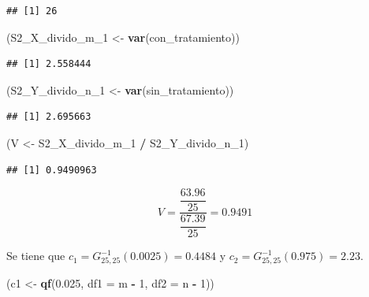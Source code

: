 \documentclass[
  12pt,
]{book}
\newenvironment{Shaded}{\begin{snugshade}}{\end{snugshade}}
\newcommand{\DataTypeTok}[1]{\textcolor[rgb]{0.13,0.29,0.53}{#1}}
\newcommand{\DecValTok}[1]{\textcolor[rgb]{0.00,0.00,0.81}{#1}}
\newcommand{\FloatTok}[1]{\textcolor[rgb]{0.00,0.00,0.81}{#1}}
\newcommand{\KeywordTok}[1]{\textcolor[rgb]{0.13,0.29,0.53}{\textbf{#1}}}
\newcommand{\NormalTok}[1]{#1}
\newcommand{\OperatorTok}[1]{\textcolor[rgb]{0.81,0.36,0.00}{\textbf{#1}}}
\newcommand{\StringTok}[1]{\textcolor[rgb]{0.31,0.60,0.02}{#1}}
\begin{document}
\begin{verbatim}
## [1] 26
\end{verbatim}

\begin{Shaded}
\begin{Highlighting}[]
\NormalTok{(S2\_X\_divido\_m\_}\DecValTok{1}\NormalTok{ \textless{}{-}}\StringTok{ }\KeywordTok{var}\NormalTok{(con\_tratamiento))}
\end{Highlighting}
\end{Shaded}

\begin{verbatim}
## [1] 2.558444
\end{verbatim}

\begin{Shaded}
\begin{Highlighting}[]
\NormalTok{(S2\_Y\_divido\_n\_}\DecValTok{1}\NormalTok{ \textless{}{-}}\StringTok{ }\KeywordTok{var}\NormalTok{(sin\_tratamiento))}
\end{Highlighting}
\end{Shaded}

\begin{verbatim}
## [1] 2.695663
\end{verbatim}

\begin{Shaded}
\begin{Highlighting}[]
\NormalTok{(V \textless{}{-}}\StringTok{ }\NormalTok{S2\_X\_divido\_m\_}\DecValTok{1} \OperatorTok{/}\StringTok{ }\NormalTok{S2\_Y\_divido\_n\_}\DecValTok{1}\NormalTok{)}
\end{Highlighting}
\end{Shaded}

\begin{verbatim}
## [1] 0.9490963
\end{verbatim}

\[V = \dfrac{\dfrac{63.96}{25}}{\dfrac{67.39}{25}} = 0.9491\]

Se tiene que \(c_1 = G^{-1}_{25,25}(0.0025) = 0.4484\) y \(c_2 = G^{-1}_{25,25}(0.975) = 2.23\).

\begin{Shaded}
\begin{Highlighting}[]
\NormalTok{(c1 \textless{}{-}}\StringTok{ }\KeywordTok{qf}\NormalTok{(}\FloatTok{0.025}\NormalTok{, }\DataTypeTok{df1 =}\NormalTok{ m }\OperatorTok{{-}}\StringTok{ }\DecValTok{1}\NormalTok{, }\DataTypeTok{df2 =}\NormalTok{ n }\OperatorTok{{-}}\StringTok{ }\DecValTok{1}\NormalTok{))}
\end{Highlighting}
\end{Shaded}
\end{document}
